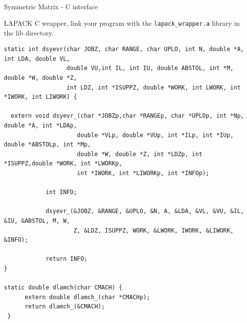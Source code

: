 \documentclass[xcolor=x11names,compress]{beamer}
\renewcommand{\(}{\begin{columns}}
\renewcommand{\)}{\end{columns}}
\newcommand{\<}[1]{\begin{column}{#1}}
\renewcommand{\>}{\end{column}}
\begin{document}
\subsection{}
\begin{frame}[fragile]{Symmetric Matrix - C interface}
\begin{tiny}
LAPACK C wrapper, link your program with the \verb+lapack_wrapper.a+ library in the lib directory. 
\begin{verbatim}
static int dsyevr(char JOBZ, char RANGE, char UPLO, int N, double *A, int LDA, double VL,
                  double VU,int IL, int IU, double ABSTOL, int *M, double *W, double *Z,
                  int LDZ, int *ISUPPZ, double *WORK, int LWORK, int *IWORK, int LIWORK) {
             
  extern void dsyevr_(char *JOBZp,char *RANGEp, char *UPLOp, int *Np, double *A, int *LDAp,
                     double *VLp, double *VUp, int *ILp, int *IUp, double *ABSTOLp, int *Mp,
                     double *W, double *Z, int *LDZp, int *ISUPPZ,double *WORK, int *LWORKp,
                     int *IWORK, int *LIWORKp, int *INFOp);
 
            int INFO;
       
            dsyevr_(&JOBZ, &RANGE, &UPLO, &N, A, &LDA, &VL, &VU, &IL, &IU, &ABSTOL, M, W,
                    Z, &LDZ, ISUPPZ, WORK, &LWORK, IWORK, &LIWORK, &INFO);
	    
            return INFO;
}

static double dlamch(char CMACH) {
      extern double dlamch_(char *CMACHp);
      return dlamch_(&CMACH);
 }            
\end{verbatim}
\end{tiny} 
\end{frame}
\end{document}
